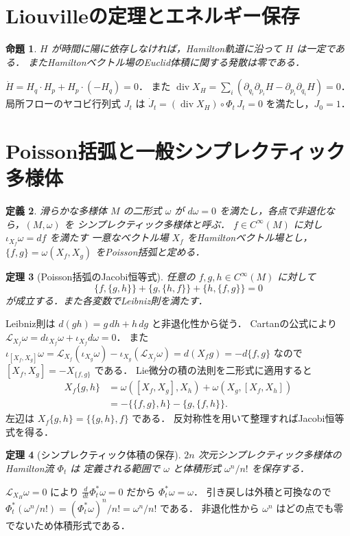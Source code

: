 \documentclass[a5paper,10pt,onecolumn]{jsarticle}
\makeatletter
\theoremstyle{mathnotetheorem}
\newtheorem{theorem}{定理}[section]
\newtheorem{definition}[theorem]{定義}
\newtheorem{proposition}[theorem]{命題}
\renewcommand{\proofname}{証明}
\renewenvironment{proof}[1][\proofname]{%
  \par\pushQED{\qed}\normalfont\topsep4\p@\@plus2\p@\relax
  \trivlist\item[\hskip\labelsep\bfseries #1]\ignorespaces
}{\popQED\endtrivlist\@endpefalse}
\makeatother
\begin{document}
\section{Liouvilleの定理とエネルギー保存}
\begin{proposition}
$H$ が時間に陽に依存しなければ，Hamilton軌道に沿って $H$ は一定である．
またHamiltonベクトル場のEuclid体積に関する発散は零である．
\end{proposition}
\begin{proof}
$\dot H=H_q\cdot H_p+H_p\cdot(-H_q)=0$．
また
$\operatorname{div}X_H=\sum_i
(\partial_{q_i}\partial_{p_i}H-\partial_{p_i}\partial_{q_i}H)=0$．
局所フローのヤコビ行列式 $J_t$ は
$\dot J_t=(\operatorname{div}X_H)\circ\Phi_t\,J_t=0$ を満たし，$J_0=1$．
\end{proof}


\section{Poisson括弧と一般シンプレクティック多様体}
\begin{definition}
滑らかな多様体 $M$ の二形式 $\omega$ が
$d\omega=0$ を満たし，各点で非退化なら，$(M,\omega)$ を
シンプレクティック多様体と呼ぶ．
$f\in C^\infty(M)$ に対し $\iota_{X_f}\omega=df$ を満たす
一意なベクトル場 $X_f$ をHamiltonベクトル場とし，
$\{f,g\}=\omega(X_f,X_g)$ をPoisson括弧と定める．
\end{definition}
\begin{theorem}[Poisson括弧のJacobi恒等式]
任意の $f,g,h\in C^\infty(M)$ に対して
\[
 \{f,\{g,h\}\}+\{g,\{h,f\}\}
 +\{h,\{f,g\}\}=0
\]
が成立する．また各変数でLeibniz則を満たす．
\end{theorem}
\begin{proof}
Leibniz則は $d(gh)=g\,dh+h\,dg$ と非退化性から従う．
Cartanの公式により
$\mathcal L_{X_f}\omega=d\iota_{X_f}\omega+\iota_{X_f}d\omega=0$．
また $\iota_{[X_f,X_g]}\omega
=\mathcal L_{X_f}(\iota_{X_g}\omega)
 -\iota_{X_g}(\mathcal L_{X_f}\omega)
=d(X_fg)=-d\{f,g\}$ なので
$[X_f,X_g]=-X_{\{f,g\}}$ である．
Lie微分の積の法則を二形式に適用すると
\[
 \begin{aligned}
 X_f\{g,h\}
 &=\omega([X_f,X_g],X_h)+\omega(X_g,[X_f,X_h])\\
 &=-\{\{f,g\},h\}-\{g,\{f,h\}\}.
\end{aligned}
\]
左辺は $X_f\{g,h\}=\{\{g,h\},f\}$ である．
反対称性を用いて整理すればJacobi恒等式を得る．
\end{proof}
\begin{theorem}[シンプレクティック体積の保存]
$2n$ 次元シンプレクティック多様体のHamilton流 $\Phi_t$ は
定義される範囲で $\omega$ と体積形式 $\omega^n/n!$ を保存する．
\end{theorem}
\begin{proof}
$\mathcal L_{X_H}\omega=0$ により
$\frac d{dt}\Phi_t^*\omega=0$ だから $\Phi_t^*\omega=\omega$．
引き戻しは外積と可換なので
$\Phi_t^*(\omega^n/n!)=(\Phi_t^*\omega)^n/n!=\omega^n/n!$ である．
非退化性から $\omega^n$ はどの点でも零でないため体積形式である．
\end{proof}
\end{document}
